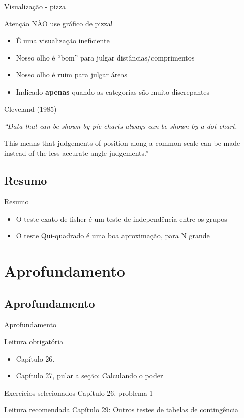 \documentclass{beamer}
\begin{document}
\begin{frame}{Visualização - pizza}
  \begin{block}{Atenção}
    NÃO use gráfico de pizza!
  \end{block}
  \begin{itemize}
    \footnotesize
  \item É uma visualização ineficiente
  \item Nosso olho é ``bom'' para julgar distâncias/comprimentos
  \item Nosso olho é ruim para julgar áreas
  \item Indicado {\bf apenas} quando as categorias são muito discrepantes
  \end{itemize}
  \begin{block}{Cleveland (1985)}
    \small
    {\em ``Data that can be shown by pie charts always can be shown by a dot chart.

      This means that judgements of position along a common scale can be made instead of the less accurate angle judgements.''}
  \end{block}
\end{frame}

\subsection{Resumo}

\begin{frame}{Resumo}
  \begin{itemize}
  \item O teste exato de fisher é um teste de independência entre os grupos
  \item O teste Qui-quadrado é uma boa aproximação, para N grande
  \end{itemize}
\end{frame}

\section{Aprofundamento}

\subsection{Aprofundamento}

\begin{frame}{Aprofundamento}
  \begin{block}{Leitura obrigatória}
    \begin{itemize}
      \small
    \item Capítulo 26.
    \item Capítulo 27, pular a seção: Calculando o poder
    \end{itemize}
  \end{block}
  \begin{block}{Exercícios selecionados}
    \footnotesize
    Capítulo 26, problema 1
  \end{block}
  \begin{block}{Leitura recomendada}
    \small
    Capítulo 29: Outros testes de tabelas de contingência
  \end{block}
\end{frame}
\end{document}
